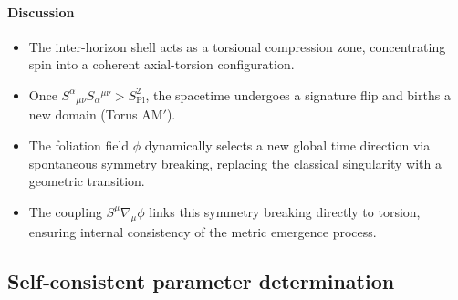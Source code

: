 \documentclass{article}
\newcommand{\Splanck}{S_{\mathrm{Pl}}}
\begin{document}
\paragraph{Discussion}
\begin{itemize}[leftmargin=*]
  \item The inter-horizon shell acts as a torsional compression zone, concentrating spin into a coherent axial-torsion configuration.
  \item Once $S^\alpha{}_{\mu\nu} S_\alpha{}^{\mu\nu} > \Splanck^2$, the spacetime undergoes a signature flip and births a new domain (Torus AM$'$).
  \item The foliation field $\phi$ dynamically selects a new global time direction via spontaneous symmetry breaking, replacing the classical singularity with a geometric transition.
  \item The coupling $S^\mu \nabla_\mu \phi$ links this symmetry breaking directly to torsion, ensuring internal consistency of the metric emergence process.
\end{itemize}





\subsection{Self‐consistent parameter determination}
\label{sec:param}

\medskip
\begin{center}
\end{center}
\medskip
\end{document}
